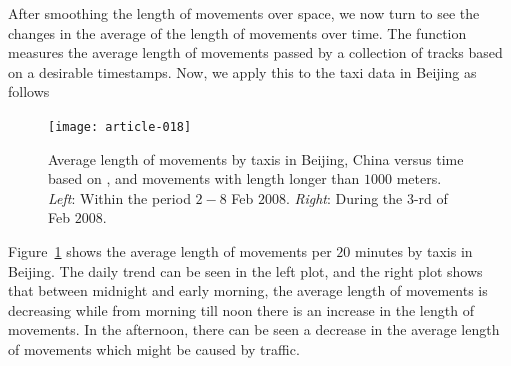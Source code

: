 \documentclass[article]{jss}
\begin{document}
 After smoothing the length of movements over space, we now turn to see the changes in the average of the length of movements over time. The function  measures the average length of movements passed by a collection of tracks based on a desirable timestamps. Now, we apply this to the taxi data in Beijing as follows
\begin{figure}[!h]
\begin{center}
\texttt{[image: article-018]}
\end{center}
\caption{Average length of movements by taxis in Beijing, China versus time based on , and movements with length longer than $1000$ meters. \emph{Left}: Within the period $2-8$ Feb $2008$. \emph{Right}: During the $3$-rd of Feb $2008$.}
\label{avemovebijing}
\end{figure}

Figure~\ref{avemovebijing} shows the average length of movements per $20$ minutes by taxis in Beijing. The daily trend can be seen in the left plot, and the right plot shows that between midnight and early morning, the average length of movements is decreasing while from morning till noon there is an increase in the length of movements. In the afternoon, there can be seen a decrease in the average length of movements which might be caused by traffic.
\end{document}
